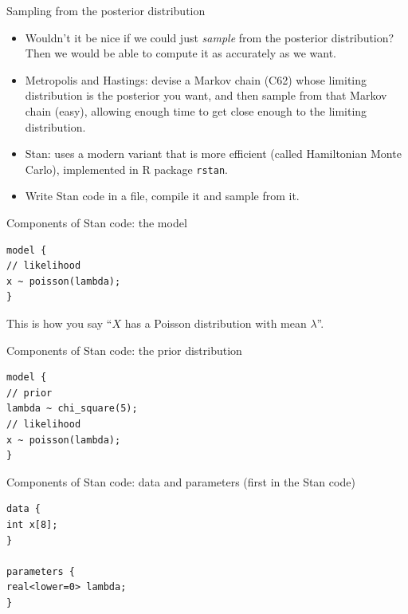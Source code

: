 \documentclass[ignorenonframetext,]{beamer}
\begin{document}
\begin{frame}[fragile]{Sampling from the posterior distribution}
\protect\hypertarget{sampling-from-the-posterior-distribution}{}

\begin{itemize}
\item
  Wouldn't it be nice if we could just \emph{sample} from the posterior
  distribution? Then we would be able to compute it as accurately as we
  want.
\item
  Metropolis and Hastings: devise a Markov chain (C62) whose limiting
  distribution is the posterior you want, and then sample from that
  Markov chain (easy), allowing enough time to get close enough to the
  limiting distribution.
\item
  Stan: uses a modern variant that is more efficient (called Hamiltonian
  Monte Carlo), implemented in R package \texttt{rstan}.
\item
  Write Stan code in a file, compile it and sample from it.
\end{itemize}

\end{frame}

\begin{frame}[fragile]{Components of Stan code: the model}
\protect\hypertarget{components-of-stan-code-the-model}{}

\begin{verbatim}
model {
// likelihood
x ~ poisson(lambda);
}
\end{verbatim}

This is how you say ``\(X\) has a Poisson distribution with mean
\(\lambda\)''.

\end{frame}

\begin{frame}[fragile]{Components of Stan code: the prior distribution}
\protect\hypertarget{components-of-stan-code-the-prior-distribution}{}

\begin{verbatim}
model {
// prior
lambda ~ chi_square(5);
// likelihood
x ~ poisson(lambda);
}
\end{verbatim}

\end{frame}

\begin{frame}[fragile]{Components of Stan code: data and parameters
(first in the Stan code)}
\protect\hypertarget{components-of-stan-code-data-and-parameters-first-in-the-stan-code}{}

\begin{verbatim}
data {
int x[8];
}

parameters {
real<lower=0> lambda;
}
\end{verbatim}

\end{frame}
\end{document}
